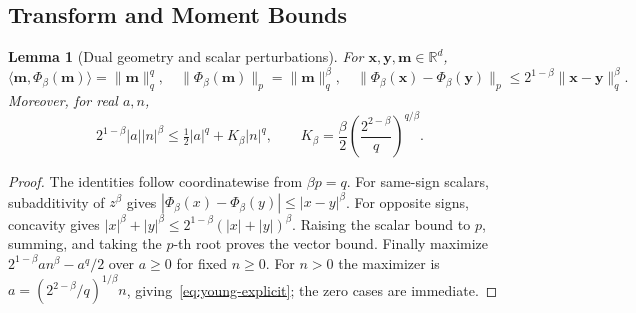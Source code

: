 \documentclass{article}
\newtheorem{lemma}{Lemma}
\begin{document}
\subsection{Transform and Moment Bounds}
\begin{lemma}[Dual geometry and scalar perturbations]\label{lemma:holder}
For $\mathbf{x},\mathbf{y},\mathbf{m}\in\mathbb R^d$,
\begin{equation}
\langle \mathbf{m},\Phi_\beta(\mathbf{m})\rangle=\|\mathbf{m}\|_q^q,\quad
\|\Phi_\beta(\mathbf{m})\|_p=\|\mathbf{m}\|_q^\beta,\quad
\|\Phi_\beta(\mathbf{x})-\Phi_\beta(\mathbf{y})\|_p\le2^{1-\beta}\|\mathbf{x}-\mathbf{y}\|_q^\beta.
\end{equation}
Moreover, for real $a,n$,
\begin{equation}\label{eq:young-explicit}
2^{1-\beta}|a||n|^\beta\le\tfrac12|a|^q+K_\beta|n|^q,
\qquad K_\beta=\frac\beta2\left(\frac{2^{2-\beta}}q\right)^{q/\beta}.
\end{equation}
\end{lemma}
\begin{proof}
The identities follow coordinatewise from $\beta p=q$. For same-sign scalars, subadditivity of $z^\beta$ gives $|\Phi_\beta(x)-\Phi_\beta(y)|\le|x-y|^\beta$. For opposite signs, concavity gives $|x|^\beta+|y|^\beta\le2^{1-\beta}(|x|+|y|)^\beta$. Raising the scalar bound to $p$, summing, and taking the $p$-th root proves the vector bound. Finally maximize $2^{1-\beta}a n^\beta-a^q/2$ over $a\ge0$ for fixed $n\ge0$. For $n>0$ the maximizer is $a=(2^{2-\beta}/q)^{1/\beta}n$, giving~\eqref{eq:young-explicit}; the zero cases are immediate.
\end{proof}
\end{document}
